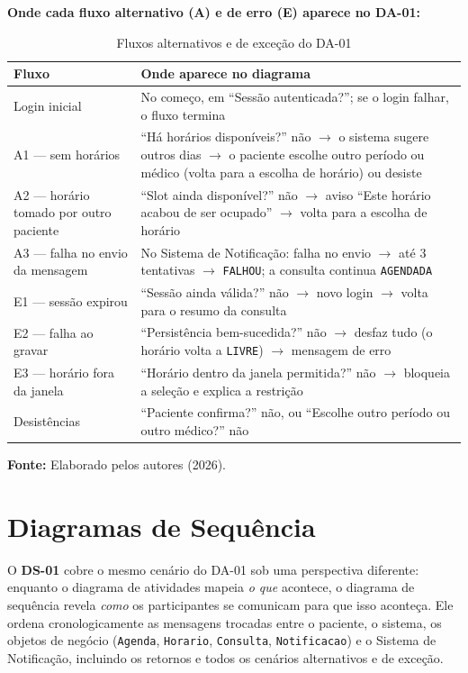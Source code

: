 \documentclass[12pt,a4paper]{article}
\newcommand{\fonte}[1]{%
  \par\vspace{2pt}%
  {\footnotesize\raggedright\textbf{Fonte:} #1\par}%
}
\begin{document}
\textbf{Onde cada fluxo alternativo (A) e de erro (E) aparece no DA-01:}

\begin{table}[H]
\centering
\caption{Fluxos alternativos e de exceção do DA-01}
\label{qua:fluxos-da01}
{\footnotesize
\begin{tabularx}{\textwidth}{@{}>{\raggedright\arraybackslash}p{6.8cm}>{\raggedright\arraybackslash}X@{}}
\toprule
Fluxo & Onde aparece no diagrama \\
\midrule
Login inicial & No começo, em ``Sessão autenticada?''; se o login falhar, o fluxo termina \\
A1 --- sem horários & ``Há horários disponíveis?'' não $\rightarrow$ o sistema sugere outros dias $\rightarrow$ o paciente escolhe outro período ou médico (volta para a escolha de horário) ou desiste \\
A2 --- horário tomado por outro paciente & ``Slot ainda disponível?'' não $\rightarrow$ aviso ``Este horário acabou de ser ocupado'' $\rightarrow$ volta para a escolha de horário \\
A3 --- falha no envio da mensagem & No Sistema de Notificação: falha no envio $\rightarrow$ até 3 tentativas $\rightarrow$ \texttt{FALHOU}; a consulta continua \texttt{AGENDADA} \\
E1 --- sessão expirou & ``Sessão ainda válida?'' não $\rightarrow$ novo login $\rightarrow$ volta para o resumo da consulta \\
E2 --- falha ao gravar & ``Persistência bem-sucedida?'' não $\rightarrow$ desfaz tudo (o horário volta a \texttt{LIVRE}) $\rightarrow$ mensagem de erro \\
E3 --- horário fora da janela & ``Horário dentro da janela permitida?'' não $\rightarrow$ bloqueia a seleção e explica a restrição \\
Desistências & ``Paciente confirma?'' não, ou ``Escolhe outro período ou outro médico?'' não \\
\bottomrule
\end{tabularx}
}
\fonte{Elaborado pelos autores (2026).}
\end{table}

\section{Diagramas de Sequência}\label{sec:sequencia}

O \textbf{DS-01} cobre o mesmo cenário do DA-01 sob uma perspectiva
diferente: enquanto o diagrama de atividades mapeia \emph{o que}
acontece, o diagrama de sequência revela \emph{como} os participantes se
comunicam para que isso aconteça. Ele ordena cronologicamente as
mensagens trocadas entre o paciente, o sistema, os objetos de negócio
(\texttt{Agenda}, \texttt{Horario}, \texttt{Consulta},
\texttt{Notificacao}) e o Sistema de Notificação, incluindo os retornos
e todos os cenários alternativos e de exceção.
\end{document}
